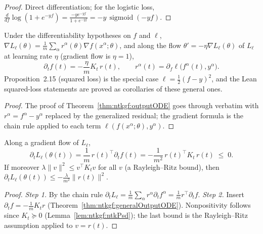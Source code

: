 \begin{proof}
  \leanok
Direct differentiation; for the logistic loss, $\frac{d}{df}\log(1+e^{-yf})=\frac{-ye^{-yf}}{1+e^{-yf}}=-y\,\operatorname{sigmoid}(-yf)$.
\end{proof}

\begin{theorem}\label{thm:ntkgf:generalOutputODE}
  \leanok
Under the differentiability hypotheses on $f$ and $\ell$, $\nabla L_\ell(\theta)=\frac1m\sum_\alpha r^\alpha(\theta)\nabla f(x^\alpha;\theta)$, and
along the flow $\theta'=-\eta\nabla L_\ell(\theta)$ of $L_\ell$ at learning rate $\eta$ (gradient flow is $\eta=1$),
\[
  \partial_tf(t)=-\frac\eta mK_t\,r(t),\qquad r^\alpha(t)=\partial_f\ell\bigl(f^\alpha(t),y^\alpha\bigr).
\]
Proposition~2.15 (squared loss) is the special case $\ell=\frac12(f-y)^2$, and the Lean squared-loss statements are proved as corollaries of these general ones.
\end{theorem}

\begin{proof}
  \leanok
The proof of Theorem~\ref{thm:ntkgf:outputODE} goes through verbatim with $r^\alpha=f^\alpha-y^\alpha$ replaced by the
generalized residual; the gradient formula is the chain rule applied to each term $\ell(f(x^\alpha;\theta),y^\alpha)$.
\end{proof}

\begin{theorem}\label{thm:ntkgf:riskDissipation}
  \leanok
Along a gradient flow of $L_\ell$,
\[
  \partial_tL_\ell(\theta(t))=\frac1m\,r(t)^\top\partial_tf(t)=-\frac1{m^2}\,r(t)^\top K_t\,r(t)\;\le\;0 .
\]
If moreover $\lambda\|v\|^2\le v^\top K_tv$ for all $v$ (a Rayleigh--Ritz bound), then
$\partial_tL_\ell(\theta(t))\le-\frac{\lambda}{m^2}\|r(t)\|^2$.
\end{theorem}

\begin{proof}
  \leanok
\emph{Step 1.} By the chain rule $\partial_tL_\ell=\frac1m\sum_\alpha r^\alpha\partial_tf^\alpha=\frac1mr^\top\partial_tf$.
\emph{Step 2.} Insert $\partial_tf=-\frac1mK_tr$ (Theorem~\ref{thm:ntkgf:generalOutputODE}). Nonpositivity follows since $K_t\succeq0$
(Lemma~\ref{lem:ntkgf:ntkPsd}); the last bound is the Rayleigh--Ritz assumption applied to $v=r(t)$.
\end{proof}

